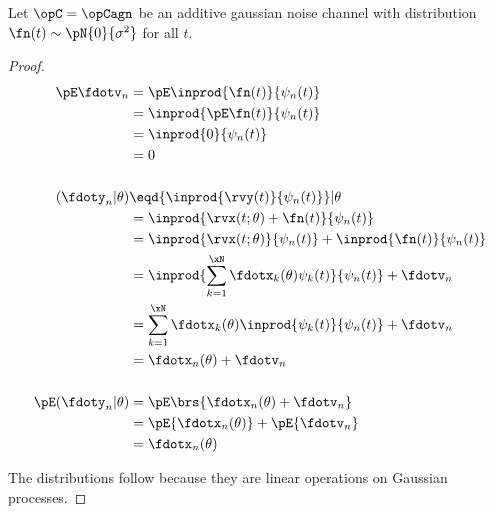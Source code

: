 \begin{theorem}%
\label{thm:agn_stats}
Let $\opC=\opCagn$ be an additive gaussian noise channel
with distribution $\fn(t)\sim\pN{0}{\sigma^2}$ for all $t$.
\end{theorem}
\begin{proof}
\begin{align*}
   \pE\fdotv_{n}
     &= \pE\inprod{\fn(t)}{\psi_n(t)}
   \\&= \inprod{\pE\fn(t)}{\psi_n(t)}
   \\&= \inprod{0}{\psi_n(t)}
   \\&= 0
\\
\\
   (\fdoty_n |\theta)
     &\eqd {\inprod{\rvy(t)}{\psi_n(t)}}  |\theta
   \\&=    {\inprod{\rvx(t;\theta)+\fn(t)}{\psi_n(t)}}
   \\&=    {\inprod{\rvx(t;\theta)}{\psi_n(t)}} +   {\inprod{\fn(t)}{\psi_n(t)}}
   \\&=    \inprod{\sum_{k=1}^\xN \fdotx_k(\theta) \psi_k(t)}{\psi_n(t)} + \fdotv_n
   \\&=    \sum_{k=1}^\xN \fdotx_k(\theta) \inprod{\psi_k(t)}{\psi_n(t)} + \fdotv_n
   \\&=    \fdotx_n(\theta)  + \fdotv_n
\\ \\
   \pE({\fdoty_n} | \theta)
     &= \pE\brs{\fdotx_n(\theta)  + \fdotv_n}
   \\&= \pE{\fdotx_n(\theta) } +   \pE{\fdotv_n}
   \\&= \fdotx_n(\theta)
\end{align*}

The distributions follow because they are linear operations on
Gaussian processes.
\end{proof}




